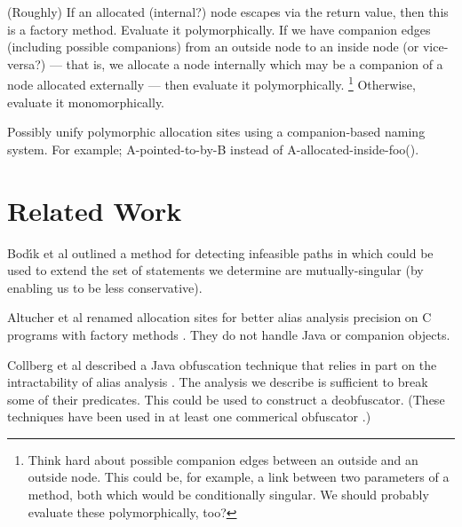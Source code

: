 \documentclass[11pt,notitlepage]{article}
\begin{document}
(Roughly) If an allocated (internal?) node escapes via the return
value, then this is a factory method.  Evaluate it polymorphically.
If we have companion edges (including possible companions) from
an outside node to an inside node (or vice-versa?) --- that is, we
allocate a node internally which may be a companion of a node allocated
externally --- then evaluate it polymorphically.%
\footnote{Think hard about possible companion edges between an
outside and an outside node.  This could be, for example, a
link between two parameters of a method, both which would be
conditionally singular.  We should probably evaluate these
polymorphically, too?}
Otherwise, evaluate it monomorphically.

Possibly unify polymorphic allocation sites using a companion-based
naming system.  For example; A-pointed-to-by-B instead of
A-allocated-inside-foo().

\section{Related Work}

Bod{\'\i}k et al outlined a method for detecting infeasible paths
in \cite{267921} which could be used to extend the set of statements
we determine are mutually-singular (by enabling us to be less conservative).

Altucher et al renamed allocation sites for better alias analysis
precision on C programs with factory methods \cite{199466}.  They
do not handle Java or companion objects.

Collberg et al described a Java obfuscation technique that relies in
part on the intractability of alias analysis \cite{268962}.  The
analysis we describe is sufficient to break some of their predicates.
This could be used to construct a deobfuscator.  (These techniques
have been used in at least one commerical obfuscator \cite{humper02}.)



\end{document}
